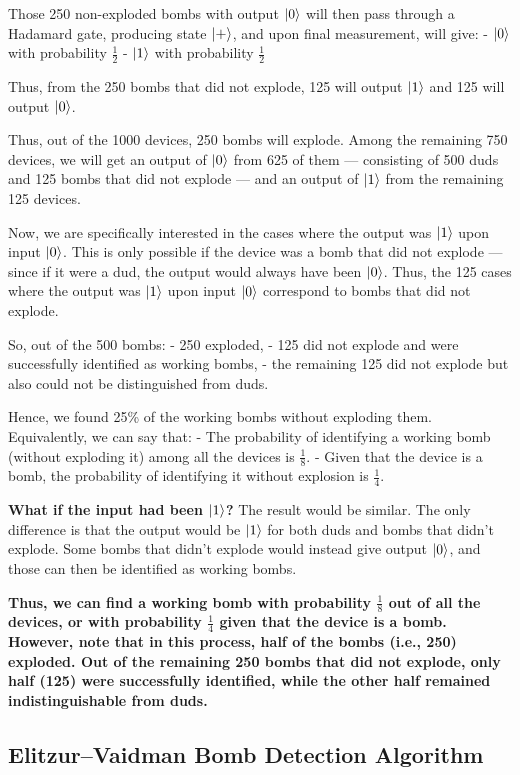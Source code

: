 Those 250 non-exploded bombs with output $\ket{0}$ will then pass through a Hadamard gate, producing state $\ket{+}$, and upon final measurement, will give:  
- $\ket{0}$ with probability $\frac{1}{2}$  
- $\ket{1}$ with probability $\frac{1}{2}$  

Thus, from the 250 bombs that did not explode, 125 will output $\ket{1}$ and 125 will output $\ket{0}$.


    Thus, out of the 1000 devices, 250 bombs will explode. Among the remaining 750 devices, we will get an output of $\ket{0}$ from 625 of them — consisting of 500 duds and 125 bombs that did not explode — and an output of $\ket{1}$ from the remaining 125 devices.

Now, we are specifically interested in the cases where the output was $\ket{1}$ upon input $\ket{0}$. This is only possible if the device was a bomb that did not explode — since if it were a dud, the output would always have been $\ket{0}$. Thus, the 125 cases where the output was $\ket{1}$ upon input $\ket{0}$ correspond to bombs that did not explode.

So, out of the 500 bombs:
- 250 exploded,
- 125 did not explode and were successfully identified as working bombs,
- the remaining 125 did not explode but also could not be distinguished from duds.

Hence, we found 25\% of the working bombs without exploding them. Equivalently, we can say that:
- The probability of identifying a working bomb (without exploding it) among all the devices is $\frac{1}{8}$.
- Given that the device is a bomb, the probability of identifying it without explosion is $\frac{1}{4}$.

\textbf{What if the input had been $\ket{1}$?}  
The result would be similar. The only difference is that the output would be $\ket{1}$ for both duds and bombs that didn’t explode. Some bombs that didn't explode would instead give output $\ket{0}$, and those can then be identified as working bombs.

\textbf{Thus, we can find a working bomb with probability $\frac{1}{8}$ out of all the devices, or with probability $\frac{1}{4}$ given that the device is a bomb. However, note that in this process, half of the bombs (i.e., 250) exploded. Out of the remaining 250 bombs that did not explode, only half (125) were successfully identified, while the other half remained indistinguishable from duds.}


\subsection{Elitzur–Vaidman Bomb Detection Algorithm}

